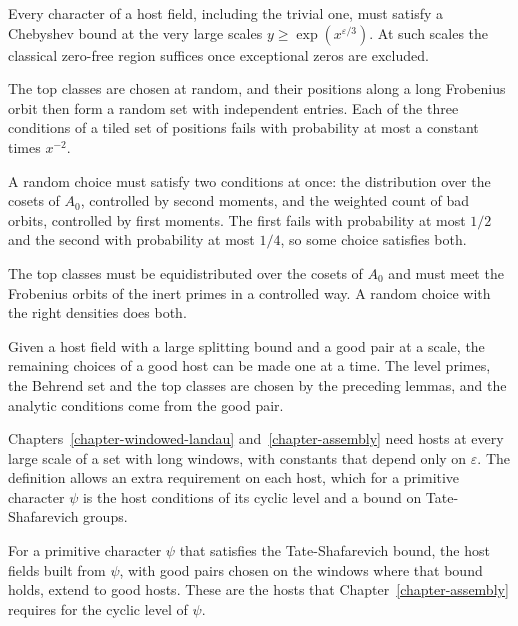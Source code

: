 Every character of a host field, including the trivial one, must satisfy a Chebyshev bound at the
very large scales $y\geq\exp(x^{\varepsilon/3})$. At such scales the classical zero-free region
suffices once exceptional zeros are excluded.

The top classes are chosen at random, and their positions along a long Frobenius orbit then form a
random set with independent entries. Each of the three conditions of a tiled set of positions fails
with probability at most a constant times $x^{-2}$.

A random choice must satisfy two conditions at once: the distribution over the cosets of $A_0$,
controlled by second moments, and the weighted count of bad orbits, controlled by first moments. The
first fails with probability at most $1/2$ and the second with probability at most $1/4$, so some
choice satisfies both.

The top classes must be equidistributed over the cosets of $A_0$ and must meet the Frobenius orbits
of the inert primes in a controlled way. A random choice with the right densities does both.

Given a host field with a large splitting bound and a good pair at a scale, the remaining choices
of a good host can be made one at a time. The level primes, the Behrend set and the top classes are
chosen by the preceding lemmas, and the analytic conditions come from the good pair.

Chapters~\ref{chapter-windowed-landau} and~\ref{chapter-assembly} need hosts at every large scale of
a set with long windows, with constants that depend only on $\varepsilon$. The definition allows an
extra requirement on each host, which for a primitive character $\psi$ is the host conditions of its
cyclic level and a bound on Tate-Shafarevich groups.

For a primitive character $\psi$ that satisfies the Tate-Shafarevich bound, the host fields built
from $\psi$, with good pairs chosen on the windows where that bound holds, extend to good hosts.
These are the hosts that Chapter~\ref{chapter-assembly} requires for the cyclic level of $\psi$.
